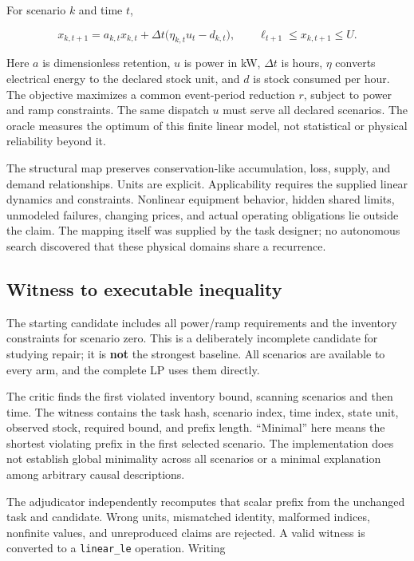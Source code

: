 For scenario \(k\) and time \(t\),

\[
x_{k,t+1}=a_{k,t}x_{k,t}+\Delta t\bigl(\eta_{k,t}u_t-d_{k,t}\bigr),\qquad
\ell_{t+1}\leq x_{k,t+1}\leq U.
\]

Here \(a\) is dimensionless retention, \(u\) is power in kW,
\(\Delta t\) is hours, \(\eta\) converts electrical energy to the
declared stock unit, and \(d\) is stock consumed per hour. The objective
maximizes a common event-period reduction \(r\), subject to power and
ramp constraints. The same dispatch \(u\) must serve all declared
scenarios. The oracle measures the optimum of this finite linear model,
not statistical or physical reliability beyond it.

The structural map preserves conservation-like accumulation, loss,
supply, and demand relationships. Units are explicit. Applicability
requires the supplied linear dynamics and constraints. Nonlinear
equipment behavior, hidden shared limits, unmodeled failures, changing
prices, and actual operating obligations lie outside the claim. The
mapping itself was supplied by the task designer; no autonomous search
discovered that these physical domains share a recurrence.

\subsection{Witness to executable
inequality}\label{witness-to-executable-inequality}

The starting candidate includes all power/ramp requirements and the
inventory constraints for scenario zero. This is a deliberately
incomplete candidate for studying repair; it is \textbf{not} the
strongest baseline. All scenarios are available to every arm, and the
complete LP uses them directly.

The critic finds the first violated inventory bound, scanning scenarios
and then time. The witness contains the task hash, scenario index, time
index, state unit, observed stock, required bound, and prefix length.
``Minimal'' here means the shortest violating prefix in the first
selected scenario. The implementation does not establish global
minimality across all scenarios or a minimal explanation among arbitrary
causal descriptions.

The adjudicator independently recomputes that scalar prefix from the
unchanged task and candidate. Wrong units, mismatched identity,
malformed indices, nonfinite values, and unreproduced claims are
rejected. A valid witness is converted to a \texttt{linear\_le}
operation. Writing

